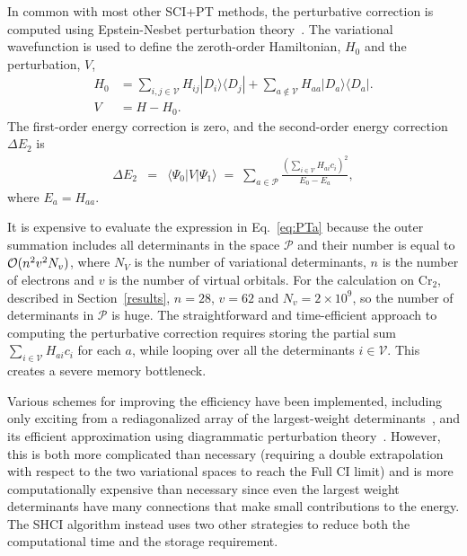 \documentclass[%
reprint,
 superscriptaddress,
 amsmath,amssymb,
 aps,
]{revtex4-1}
\def\beq{\begin{eqnarray}}
\def\eeq{\end{eqnarray}}
\def\V{\mathcal{V}}
\def\P{\mathcal{P}}
\begin{document}
In common with most other SCI+PT methods, the perturbative correction is
computed using Epstein-Nesbet perturbation theory~\cite{Eps-PR-26,Nes-PRS-55}.
The variational wavefunction is used to define the zeroth-order Hamiltonian, $H_0$ and the perturbation, $V$,
\begin{align}
H_0 &= \sum_{i,j \in \V} H_{ij} |D_i\rangle\langle D_j| + \sum_{a \notin \V } H_{aa} |D_a\rangle\langle D_a|. \nonumber\\
V &= H - H_0 . \label{eq:part}
\end{align}
The first-order energy correction is zero, and the second-order energy correction $\Delta E_{2}$ is
\beq
 \Delta E_{2} &=& \langle\Psi_0|V|\Psi_1\rangle
 \;=\; \sum_{a \in \P} \frac{\left(\sum_{i \in \V} H_{ai} c_i\right)^2}{E_0 - E_a},
\label{eq:PTa}
\eeq
where $E_a=H_{aa}$.

It is expensive to evaluate the expression in Eq.~\ref{eq:PTa} because the outer summation includes all determinants in the space $\P$ and their number is equal to ${\cal O}(n^2v^2N_v)$, where $N_V$ is the number of variational determinants, $n$ is the number of electrons and $v$ is
the number of virtual orbitals. For the calculation on Cr$_2$, described in Section~\ref{results},
$n=28$, $v=62$ and $N_v=2 \times 10^9$, so the number of determinants in $\P$ is huge.
The straightforward
and time-efficient approach to computing the perturbative correction requires storing
the partial sum $\sum_{i \in \V} H_{ai} c_i$ for each $a$, while
looping over all the determinants $i\in\V$. This creates a severe memory bottleneck.

Various schemes for improving the efficiency have been implemented, including only exciting from
a rediagonalized array of the largest-weight determinants~\cite{EvaDauMal-CP-83}, and its efficient approximation using
diagrammatic perturbation theory~\cite{CimPer-JCoP-87}.
However, this is both more complicated than necessary (requiring a double extrapolation with respect to the two
variational spaces to reach the Full CI limit) and is more computationally expensive than necessary since even
the largest weight determinants have many connections that make small contributions to the energy.
The SHCI algorithm instead uses two other strategies to reduce both the computational time and the storage requirement.
\end{document}
